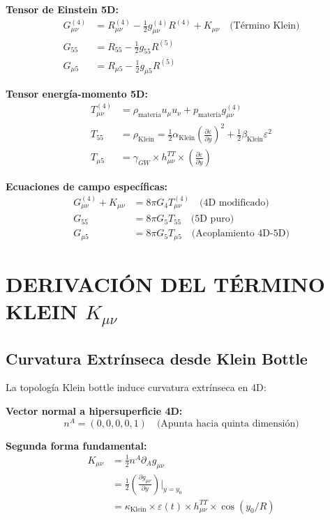 \documentclass[12pt,a4paper]{article}
\begin{document}
\textbf{Tensor de Einstein 5D:}
\begin{align}
G_{\mu\nu}^{(4)} &= R_{\mu\nu}^{(4)} - \frac{1}{2}g_{\mu\nu}^{(4)}R^{(4)} + K_{\mu\nu} \quad \text{(Término Klein)}\\
G_{55} &= R_{55} - \frac{1}{2}g_{55} R^{(5)}\\
G_{\mu 5} &= R_{\mu 5} - \frac{1}{2}g_{\mu 5} R^{(5)}
\end{align}

\textbf{Tensor energía-momento 5D:}
\begin{align}
T_{\mu\nu}^{(4)} &= \rho_{\text{materia}} u_\mu u_\nu + p_{\text{materia}} g_{\mu\nu}^{(4)}\\
T_{55} &= \rho_{\text{Klein}} = \frac{1}{2}\alpha_{\text{Klein}}\left(\frac{\partial\varepsilon}{\partial y}\right)^2 + \frac{1}{2}\beta_{\text{Klein}} \varepsilon^2\\
T_{\mu 5} &= \gamma_{GW} \times h_{\mu\nu}^{TT} \times \left(\frac{\partial\varepsilon}{\partial y}\right)
\end{align}

\textbf{Ecuaciones de campo específicas:}
\begin{align}
G_{\mu\nu}^{(4)} + K_{\mu\nu} &= 8\pi G_4 T_{\mu\nu}^{(4)} \quad \text{(4D modificado)}\\
G_{55} &= 8\pi G_5 T_{55} \quad \text{(5D puro)}\\
G_{\mu 5} &= 8\pi G_5 T_{\mu 5} \quad \text{(Acoplamiento 4D-5D)}
\end{align}

\section{DERIVACIÓN DEL TÉRMINO KLEIN $K_{\mu\nu}$}

\subsection{Curvatura Extrínseca desde Klein Bottle}

La topología Klein bottle induce curvatura extrínseca en 4D:

\textbf{Vector normal a hipersuperficie 4D:}
\begin{equation}
n^A = (0, 0, 0, 0, 1) \quad \text{(Apunta hacia quinta dimensión)}
\end{equation}

\textbf{Segunda forma fundamental:}
\begin{align}
K_{\mu\nu} &= \frac{1}{2} n^A \partial_A g_{\mu\nu}\\
&= \frac{1}{2} \left(\frac{\partial g_{\mu\nu}}{\partial y}\right)\bigg|_{y=y_0}\\
&= \kappa_{\text{Klein}} \times \varepsilon(t) \times h_{\mu\nu}^{TT} \times \cos(y_0/R)
\end{align}
\end{document}
